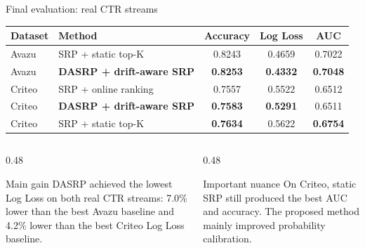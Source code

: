 \documentclass[aspectratio=169,xcolor=dvipsnames]{beamer}
\begin{document}
\begin{frame}{Final evaluation: real CTR streams}
\scriptsize
\centering
\begin{tabular}{llccc}
\toprule
Dataset & Method & Accuracy & Log Loss & AUC \\
\midrule
Avazu & SRP + static top-K & 0.8243 & 0.4659 & 0.7022 \\
Avazu & \textbf{DASRP + drift-aware SRP} & \textbf{0.8253} & \textbf{0.4332} & \textbf{0.7048} \\
\midrule
Criteo & SRP + online ranking & 0.7557 & 0.5522 & 0.6512 \\
Criteo & \textbf{DASRP + drift-aware SRP} & \textbf{0.7583} & \textbf{0.5291} & 0.6511 \\
Criteo & SRP + static top-K & \textbf{0.7634} & 0.5622 & \textbf{0.6754} \\
\bottomrule
\end{tabular}

\vspace{0.35cm}
\begin{columns}[T]
    \begin{column}{0.48\textwidth}
        \begin{block}{Main gain}
        \small
        DASRP achieved the lowest Log Loss on both real CTR streams: 7.0\% lower than the best Avazu baseline and 4.2\% lower than the best Criteo Log Loss baseline.
        \end{block}
    \end{column}
    \begin{column}{0.48\textwidth}
        \begin{alertblock}{Important nuance}
        \small
        On Criteo, static SRP still produced the best AUC and accuracy. The proposed method mainly improved probability calibration.
        \end{alertblock}
    \end{column}
\end{columns}
\end{frame}
\end{document}
